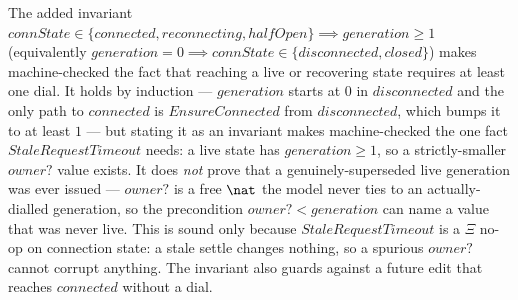 \documentclass[a4paper,10pt,fleqn]{article}
\begin{document}
The added invariant $connState \in \{ connected, reconnecting,
halfOpen \} \implies generation \geq 1$ (equivalently $generation =
0 \implies connState \in \{ disconnected, closed \}$) makes
machine-checked the fact that reaching a live or recovering state
requires at least one dial.  It holds by induction --- $generation$
starts at $0$ in $disconnected$ and the only path to $connected$ is
$EnsureConnected$ from $disconnected$, which bumps it to at least
$1$ --- but stating it as an invariant makes machine-checked the one
fact $StaleRequestTimeout$ needs: a live state has $generation \geq 1$,
so a strictly-smaller $owner?$ value exists.  It does \emph{not} prove
that a genuinely-superseded live generation was ever issued --- $owner?$
is a free $\nat$ the model never ties to an actually-dialled generation,
so the precondition $owner? < generation$ can name a value that was never
live.  This is sound only because $StaleRequestTimeout$ is a $\Xi$ no-op
on connection state: a stale settle changes nothing, so a spurious
$owner?$ cannot corrupt anything.  The invariant also guards against a
future edit that reaches $connected$ without a dial.
\end{document}
